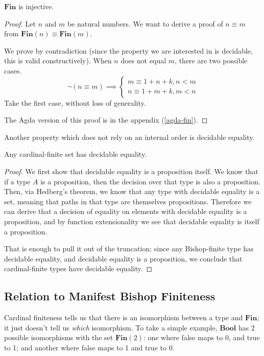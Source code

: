 \begin{lemma} \label{fin-inj}
  \(\textbf{Fin}\) is injective.
\end{lemma}
\begin{proof}
  Let \(n\) and \(m\) be natural numbers.
  We want to derive a proof of \(n \equiv m\) from \(\textbf{Fin}(n) \equiv
  \textbf{Fin}(m)\).

  We prove by contradiction (since the property we are interested in is
  decidable, this is valid constructively).
  When \(n\) does not equal \(m\), there are two possible cases.
  \begin{equation}
    \neg (n \equiv m) \implies
    \begin{cases}
      m \equiv 1 + n + k, n < m  \\
      n \equiv 1 + m + k, m < n
    \end{cases}
  \end{equation}
  Take the first case, without loss of generality.

  The Agda version of this proof is in the appendix (\ref{agda-fin}).
\end{proof}

Another property which does not rely on an internal order is decidable equality.
\begin{theorem} \label{cardinal-finite-discrete}
  Any cardinal-finite set has decidable equality.
\end{theorem}
\begin{proof}
  We first show that decidable equality is a proposition itself.
  We know that if a type \(A\) is a proposition, then the decision over that
  type is also a proposition.
  Then, via Hedberg's theorem, we know that any type with decidable equality is
  a set, meaning that paths in that type are themselves propositions.
  Therefore we can derive that a decision of equality on elements with decidable
  equality is a proposition, and by function extensionality we see that
  decidable equality is itself a proposition.

  That is enough to pull it out of the truncation: since any Bishop-finite type
  has decidable equality, and decidable equality is a proposition, we conclude
  that cardinal-finite types have decidable equality.
\end{proof}
\subsection{Relation to Manifest Bishop Finiteness}
Cardinal finiteness tells us that there is an isomorphism between a type and
\(\mathbf{Fin}\); it just doesn't tell us \emph{which} isomorphism.
To take a simple example, \(\mathbf{Bool}\) has 2 possible isomorphisms with the
set \(\mathbf{Fin}(2)\): one where false maps to 0, and true to 1; and another
where false maps to 1 and true to 0.

